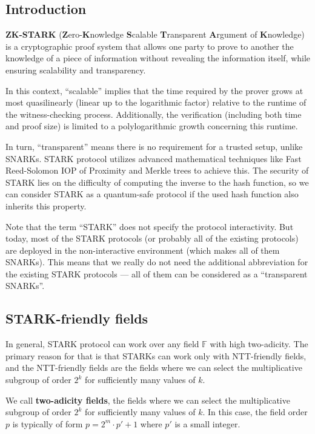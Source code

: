 \documentclass[../lecture-notes-148x210.tex]{subfiles}
\begin{document}
\subsection{Introduction}

\textbf{ZK-STARK} (\textbf{Z}ero-\textbf{K}nowledge \textbf{S}calable
\textbf{T}ransparent \textbf{A}rgument of \textbf{K}nowledge) is a cryptographic
proof system that allows one party to prove to another the knowledge of a piece
of information without revealing the information itself, while ensuring
scalability and transparency. 

In this context, ``scalable'' implies that the time required by the prover grows
at most quasilinearly (linear up to the logarithmic factor) relative to the
runtime of the witness-checking process. Additionally, the verification
(including both time and proof size) is limited to a polylogarithmic growth
concerning this runtime.

In turn, ``transparent'' means there is no requirement for a trusted setup,
unlike SNARKs. STARK protocol utilizes advanced mathematical techniques like
Fast Reed-Solomon IOP of Proximity and Merkle trees to achieve this. The
security of STARK lies on the difficulty of computing the inverse to
the hash function, so we can consider STARK as a quantum-safe protocol if the
used hash function also inherits this property.

Note that the term ``STARK'' does not specify the protocol interactivity. But
today, most of the STARK protocols (or probably all of the existing protocols)
are deployed in the non-interactive environment (which makes all of them
SNARKs). This means that we really do not need the additional abbreviation for
the existing STARK protocols --- all of them can be considered as a ``transparent
SNARKs''.

\subsection{STARK-friendly fields}
In general, STARK protocol can work over any field $\mathbb{F}$ with high two-adicity. The primary 
reason for that is that STARKs can work only with NTT-friendly fields, and the
NTT-friendly fields are the fields where we can select the multiplicative
subgroup of order $2^k$ for sufficiently many values of $k$. 

\begin{definition}
    We call \textbf{two-adicity fields}, the fields where we can select the
    multiplicative subgroup of order $2^k$ for sufficiently many values of $k$.
    In this case, the field order $p$ is typically of form $p = 2^m \cdot p' +
    1$ where $p'$ is a small integer.
\end{definition}
\end{document}
